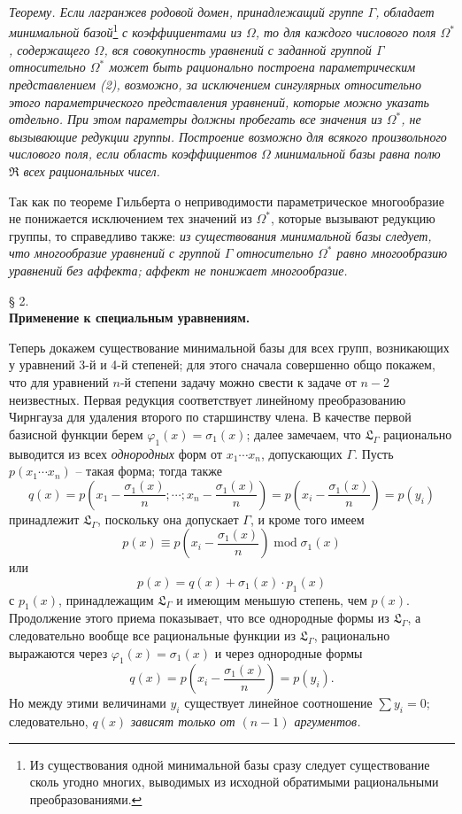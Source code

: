 \documentclass[11pt]{article}
\begin{document}
\emph{Теорему. Если лагранжев родовой домен, принадлежащий группе $\Gamma$, обладает минимальной базой}\footnote{Из существования одной минимальной базы сразу следует существование сколь угодно многих, выводимых из исходной обратимыми рациональными преобразованиями.} \emph{с коэффициентами из $\Omega$, то для каждого числового поля $\Omega^*$, содержащего $\Omega$, вся совокупность уравнений с заданной группой $\Gamma$ относительно $\Omega^*$ может быть рационально построена параметрическим представлением (2), возможно, за исключением сингулярных относительно этого параметрического представления уравнений, которые можно указать отдельно. При этом параметры должны пробегать все значения из $\Omega^*$, не вызывающие редукции группы. Построение возможно для всякого произвольного числового поля, если область коэффициентов $\Omega$ минимальной базы равна полю $\mathfrak R$ всех рациональных чисел.}

Так как по теореме Гильберта о неприводимости параметрическое многообразие не понижается исключением тех значений из $\Omega^*$, которые вызывают редукцию группы, то справедливо также: \emph{из существования минимальной базы следует, что многообразие уравнений с группой $\Gamma$ относительно $\Omega^*$ равно многообразию уравнений без аффекта; аффект не понижает многообразие.}

\begin{center}
§ 2.\\[0.75\baselineskip]
\textbf{Применение к специальным уравнениям.}
\end{center}

Теперь докажем существование минимальной базы для всех групп, возникающих у уравнений 3-й и 4-й степеней; для этого сначала совершенно общо покажем, что для уравнений $n$-й степени задачу можно свести к задаче от $n-2$ неизвестных. Первая редукция соответствует линейному преобразованию Чирнгауза для удаления второго по старшинству члена. В качестве первой базисной функции берем $\varphi_1(x)=\sigma_1(x)$; далее замечаем, что $\mathfrak L_\Gamma$ рационально выводится из всех \emph{однородных} форм от $x_1\cdots x_n$, допускающих $\Gamma$. Пусть $p(x_1\cdots x_n)$ -- такая форма; тогда также
\[
q(x)=p\left(x_1-\frac{\sigma_1(x)}{n};\cdots;x_n-\frac{\sigma_1(x)}{n}\right)=p\left(x_i-\frac{\sigma_1(x)}{n}\right)=p(y_i)
\]
принадлежит $\mathfrak L_\Gamma$, поскольку она допускает $\Gamma$, и кроме того имеем
\[
p(x)\equiv p\left(x_i-\frac{\sigma_1(x)}{n}\right)\operatorname{mod}\sigma_1(x)
\]
или
\[
p(x)=q(x)+\sigma_1(x)\cdot p_1(x)
\]
с $p_1(x)$, принадлежащим $\mathfrak L_\Gamma$ и имеющим меньшую степень, чем $p(x)$. Продолжение этого приема показывает, что все однородные формы из $\mathfrak L_\Gamma$, а следовательно вообще все рациональные функции из $\mathfrak L_\Gamma$, рационально выражаются через $\varphi_1(x)=\sigma_1(x)$ и через однородные формы
\[
q(x)=p\left(x_i-\frac{\sigma_1(x)}{n}\right)=p(y_i).
\]
Но между этими величинами $y_i$ существует линейное соотношение $\sum y_i=0$; следовательно, $q(x)$ \emph{зависят только от $(n-1)$ аргументов.}
\end{document}
